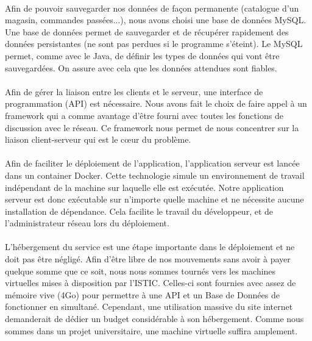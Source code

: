 \documentclass[a4paper, 12pt]{article}
\begin{document}
\paragraph{}Afin de pouvoir sauvegarder nos données de façon permanente (catalogue d’un magasin, commandes passées...), nous avons choisi une base de données MySQL. Une base de données permet de sauvegarder et de récupérer rapidement des données persistantes (ne sont pas perdues si le programme s'éteint).  Le MySQL permet, comme avec le Java, de définir les types de données qui vont être sauvegardées. On assure avec cela que les données attendues sont fiables.

\paragraph{}Afin de gérer la liaison entre les clients et le serveur, une interface de programmation (API) est nécessaire. Nous avons fait le choix de faire appel à un framework qui a comme avantage d’être fourni avec toutes les fonctions de discussion avec le réseau. Ce framework nous permet de nous concentrer sur la liaison client-serveur qui est le cœur du problème.

\paragraph{}Afin de faciliter le déploiement de l’application, l’application serveur est lancée dans un container Docker. Cette technologie simule un environnement de travail indépendant de la machine sur laquelle elle est exécutée. Notre application serveur est donc exécutable sur n’importe quelle machine et ne nécessite aucune installation de dépendance. Cela facilite le travail du développeur, et de l’administrateur réseau lors du déploiement.

\paragraph{}L’hébergement du service est une étape importante dans le déploiement et ne doit pas être négligé. Afin d’être libre de nos mouvements sans avoir à payer quelque somme que ce soit, nous nous sommes tournés vers les machines virtuelles mises à disposition par l’ISTIC. Celles-ci sont fournies avec assez de mémoire vive (4Go) pour permettre à une API et un Base de Données de fonctionner en simultané. Cependant, une utilisation massive du site internet demanderait de dédier un budget considérable à son hébergement. Comme nous sommes dans un projet universitaire, une machine virtuelle suffira amplement.
\end{document}
